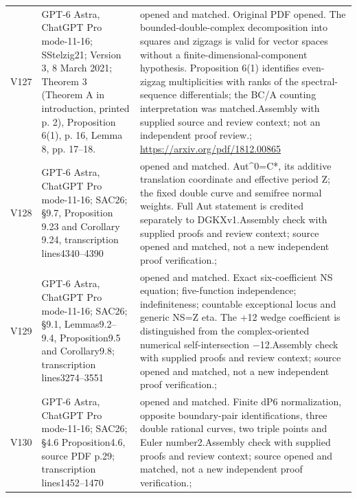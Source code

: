\begin{longtable}{@{}L{.08\linewidth}L{.31\linewidth}L{.56\linewidth}@{}}
V127 & GPT-6 Astra, ChatGPT Pro mode-11-16; S\newline Stelzig21; Version 3, 8 March 2021; Theorem 3 (Theorem A in introduction, printed p. 2), Proposition 6(1), p. 16, Lemma 8, pp. 17--18. & opened and matched. Original PDF opened. The bounded-double-complex decomposition into squares and zigzags is valid for vector spaces without a finite-dimensional-component hypothesis. Proposition 6(1) identifies even-zigzag multiplicities with ranks of the spectral-sequence differentials; the BC/\allowbreak{}A counting interpretation was matched.\newline Assembly with supplied source and review context; not an independent proof review.\newline {}; \url{https://arxiv.org/pdf/1812.00865}\\
V128 & GPT-6 Astra, ChatGPT Pro mode-11-16; S\newline AC26; §9.7, Proposition 9.23 and Corollary 9.24, transcription lines4340--4390 & opened and matched. Aut\textasciicircum{}0=C*, its additive translation coordinate and effective period Z; the fixed double curve and semifree normal weights. Full Aut statement is credited separately to DGKXv1.\newline Assembly check with supplied proofs and review context; source opened and matched, not a new independent proof verification.\newline {}; \\
V129 & GPT-6 Astra, ChatGPT Pro mode-11-16; S\newline AC26; §9.1, Lemmas9.2--9.4, Proposition9.5 and Corollary9.8; transcription lines3274--3551 & opened and matched. Exact six-coefficient NS equation; five-function independence; indefiniteness; countable exceptional locus and generic NS=Z eta. The +12 wedge coefficient is distinguished from the complex-oriented numerical self-intersection −12.\newline Assembly check with supplied proofs and review context; source opened and matched, not a new independent proof verification.\newline {}; \\
V130 & GPT-6 Astra, ChatGPT Pro mode-11-16; S\newline AC26; §4.6 Proposition4.6, source PDF p.29; transcription lines1452--1470 & opened and matched. Finite dP6 normalization, opposite boundary-pair identifications, three double rational curves, two triple points and Euler number2.\newline Assembly check with supplied proofs and review context; source opened and matched, not a new independent proof verification.\newline {}; \\

\end{longtable}
